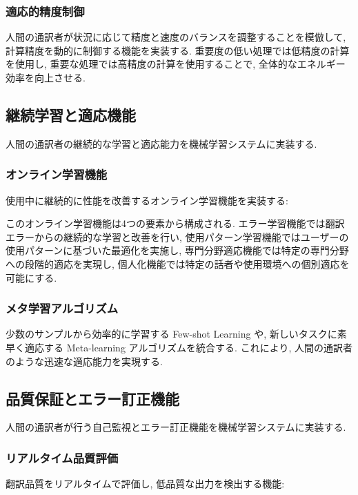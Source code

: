 \subsubsection{適応的精度制御}

人間の通訳者が状況に応じて精度と速度のバランスを調整することを模倣して, 計算精度を動的に制御する機能を実装する.
重要度の低い処理では低精度の計算を使用し, 重要な処理では高精度の計算を使用することで, 全体的なエネルギー効率を向上させる.

\subsection{継続学習と適応機能}

人間の通訳者の継続的な学習と適応能力を機械学習システムに実装する.

\subsubsection{オンライン学習機能}

使用中に継続的に性能を改善するオンライン学習機能を実装する:

このオンライン学習機能は4つの要素から構成される.
エラー学習機能では翻訳エラーからの継続的な学習と改善を行い, 使用パターン学習機能ではユーザーの使用パターンに基づいた最適化を実施し, 専門分野適応機能では特定の専門分野への段階的適応を実現し, 個人化機能では特定の話者や使用環境への個別適応を可能にする.

\subsubsection{メタ学習アルゴリズム}

少数のサンプルから効率的に学習する Few-shot Learning や, 新しいタスクに素早く適応する Meta-learning アルゴリズムを統合する.
これにより, 人間の通訳者のような迅速な適応能力を実現する.

\subsection{品質保証とエラー訂正機能}

人間の通訳者が行う自己監視とエラー訂正機能を機械学習システムに実装する.

\subsubsection{リアルタイム品質評価}

翻訳品質をリアルタイムで評価し, 低品質な出力を検出する機能:

